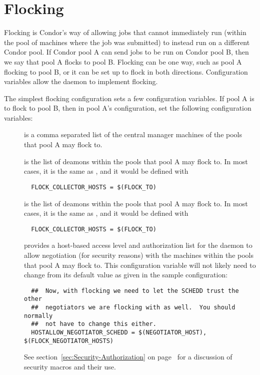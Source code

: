 \section{\label{sec:Flocking}Flocking}

Flocking is Condor's way of allowing jobs that cannot immediately
run (within the pool of machines where the job was
submitted) to instead run on a different Condor pool. 
If Condor pool A can send jobs to be run on Condor pool B,
then we say that pool A flocks to pool B.
Flocking can be one way,
such as pool A flocking to pool B,
or it can be set up to flock in both directions. 
Configuration variables allow the
 daemon to implement flocking.

The simplest flocking configuration sets
a few configuration variables.
If pool A is to flock to pool B, 
then in pool A's configuration,
set the following configuration variables:
\begin{description}
  \item[] is a comma separated list of the central
  manager machines of the pools that pool A may flock to.
  \item[]
  is the list of  deamons within the pools
  that pool A may flock to.
  In most cases, it is the same as , and
  it would be defined with 
  \begin{verbatim}
  FLOCK_COLLECTOR_HOSTS = $(FLOCK_TO)
  \end{verbatim}
  \item[]
  is the list of  deamons within the pools
  that pool A may flock to.
  In most cases, it is the same as , and
  it would be defined with 
  \begin{verbatim}
  FLOCK_COLLECTOR_HOSTS = $(FLOCK_TO)
  \end{verbatim}
  \item[]
  provides a host-based access level and authorization list for the
   daemon to allow negotiation (for security
  reasons) with the machines within the pools
  that pool A may flock to.
  This configuration variable will not likely need to change
  from its default value as given in the sample configuration:
  \footnotesize
  \begin{verbatim}
  ##  Now, with flocking we need to let the SCHEDD trust the other
  ##  negotiators we are flocking with as well.  You should normally
  ##  not have to change this either.
  HOSTALLOW_NEGOTIATOR_SCHEDD = $(NEGOTIATOR_HOST), $(FLOCK_NEGOTIATOR_HOSTS)
  \end{verbatim}
  \normalsize
  See 
  section~\ref{sec:Security-Authorization} on
  page~\pageref{sec:Security-Authorization} for a discussion
  of security macros and their use.
\end{description}

